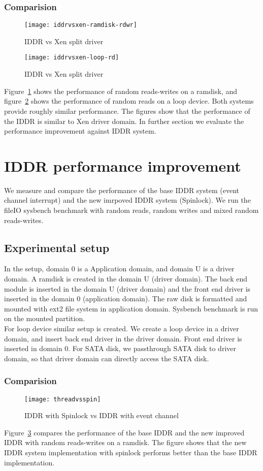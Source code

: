 \subsubsection*{Comparision}
\begin{figure}[!ht]
\centering
\texttt{[image: iddrvsxen-ramdisk-rdwr]}
\caption{IDDR vs Xen split driver}
\label{fig:iddrvsxen-ramdisk-rdwr}
\end{figure}
\begin{figure}[!ht]
\centering
\texttt{[image: iddrvsxen-loop-rd]}
\caption{IDDR vs Xen split driver}
\label{fig:iddrvsxen-loop-rd}
\end{figure}
Figure~\ref{fig:iddrvsxen-ramdisk-rdwr} shows the performance of random reads-writes on a ramdisk, and figure~\ref{fig:iddrvsxen-loop-rd} shows the performance of random reads on a loop device. Both systems provide roughly similar performance. The figures show that the performance of the IDDR is similar to Xen driver domain. In further section we evaluate the performance improvement against IDDR system.

\section{IDDR performance improvement}
We measure and compare the performance of the base IDDR system (event channel interrupt) and the new imrpoved IDDR system (Spinlock). We run the fileIO sysbench benchmark with random reads, random writes and mixed random reads-writes. 
\subsection{Experimental setup}
In the setup, domain 0 is a Application domain, and domain U is a driver domain. A ramdisk is created in the domain U (driver domain). The back end module is inserted in the domain U (driver domain) and the front end driver is inserted in the domain 0 (application domain). The raw disk is formatted and mounted with ext2 file system in application domain. Sysbench benchmark is run on the mounted partition. 
\\[3mm]
For loop device similar setup is created. We create a loop device in a driver domain, and insert back end driver in the driver domain. Front end driver is inserted in domain 0. For SATA disk, we passthrough SATA disk to driver domain, so that driver domain can directly access the SATA disk. 
\subsubsection*{Comparision}
\begin{figure}[!ht]
\centering
\texttt{[image: threadvsspin]}
\caption{IDDR with Spinlock vs IDDR with event channel}
\label{fig:threadvsspin}
\end{figure}
Figure~\ref{fig:threadvsspin} compares the performance of the base IDDR and the new improved IDDR with random reads-writes on a ramdisk. The figure shows that the new IDDR system implementation with spinlock performs better than the base IDDR implementation. 
\pagebreak


